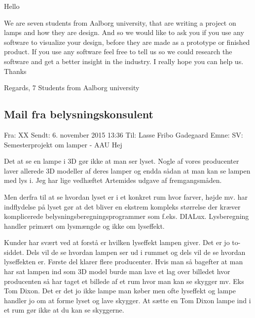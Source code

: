   Hello
   
   
  We are seven students from Aalborg university, that are writing a project on lamps and how they are design. And so we would like to ask you if you use any software to visualize your design, before they are made as a prototype or finished product. If you use any software feel free to tell us so we could research the software and get a better insight in the industry. I really hope you can help us. Thanks
   
   
  Regards,
  7 Students from Aalborg university
  
\subsection{Mail fra belysningskonsulent}
\label{sec:mailbelysning}
Fra: XX \newline
Sendt: 6. november 2015 13:36 \newline
Til: Lasse Fribo Gadegaard\newline
Emne: SV: Semesterprojekt om lamper - AAU\newline
Hej
 
Det at se en lampe i 3D gør ikke at man ser lyset. Nogle af vores producenter laver allerede 3D modeller af deres lamper og endda sådan at man kan se lampen med lys i. Jeg har lige vedhæftet Artemides udgave af fremgangsmåden.

Men derfra til at se hvordan lyset er i et konkret rum hvor farver, højde mv. har indflydelse på lyset gør at det bliver en ekstrem kompleks størrelse der kræver komplicerede belysningsberegningsprogrammer som f.eks. DIALux. Lysberegning handler primært om lysmængde og ikke om lyseffekt.

Kunder har svært ved at forstå er hvilken lyseffekt lampen giver. Det er jo to-siddet. Dels vil de se hvordan lampen ser ud i rummet og dels vil de se hvordan lyseffekten er. Første del klarer flere producenter. Hvis man så bagefter at man har sat lampen ind som 3D model burde man lave et lag over billedet hvor producenten så har taget et billede af et rum hvor man kan se skygger mv. Eks Tom Dixon. Det er det jo ikke lampe man køber men ofte lyseffekt og lampe handler jo om at forme lyset og lave skygger. At sætte en Tom Dixon lampe ind i et rum gør ikke at du kan se skyggerne.

